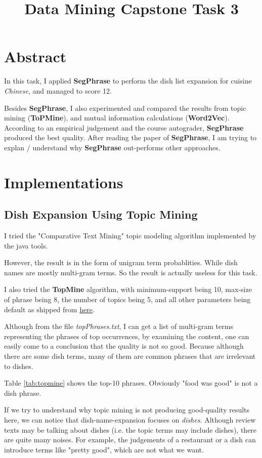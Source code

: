 \documentclass[11pt]{article}
\title{Data Mining Capstone Task 3}
\begin{document}
\maketitle

\section{Abstract}
In this task, I applied \textbf{SegPhrase} to perform the dish list expansion for cuisine \emph{Chinese}, and managed to score 12.

Besides \textbf{SegPhrase}, I also experimented and compared the results from topic mining (\textbf{ToPMine}), and mutual information calculations (\textbf{Word2Vec}).
According to an empirical judgement and the course autograder, \textbf{SegPhrase} produced the best quality.
After reading the paper of \textbf{SegPhrase}, I am trying to explan / understand why \textbf{SegPhrase} out-performs other approaches.

\section{Implementations}
\subsection{Dish Expansion Using Topic Mining}
I tried the "Comparative Text Mining" topic modeling algorithm implemented by the java tools.

However, the result is in the form of unigram term probablities. While dish names are mostly multi-gram terms. So the result is actually useless for this task.

\vspace{1.5em}
I also tried the \textbf{TopMine} algorithm, with minimum-support being 10, max-size of phrase being 8, the number of topics being 5, and all other parameters being default as shipped from \href{http://web.engr.illinois.edu/~elkishk2/}{here}.

Although from the file \emph{topPhrases.txt}, I can get a list of multi-gram terms representing the phrases of top occurrences, by examining the content, one can easily come to a conclusion that the quality is not so good. Because although there are some dish terms, many of them are common phrases that are irrelevant to dishes.

Table \ref{tab:topmine} shows the top-10 phrases. Obviously "food was good" is not a dish phrase.

If we try to understand why topic mining is not producing good-quality results here,
we can notice that dish-name-expansion focuses on \emph{dishes}.
Although review texts may be talking about dishes (i.e. the topic terms may include dishes), there are quite many noises.
For example, the judgements of a restaurant or a dish can introduce terms like "pretty good", which are not what we want.
\end{document}
